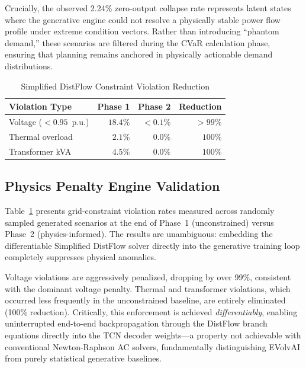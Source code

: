\documentclass[conference]{IEEEtran}
\begin{document}
Crucially, the observed 2.24\% zero-output collapse rate represents latent states where the generative engine could not resolve a physically stable power flow profile under extreme condition vectors. Rather than introducing ``phantom demand,'' these scenarios are filtered during the CVaR calculation phase, ensuring that planning remains anchored in physically actionable demand distributions.

\begin{table}[!t]
  \centering
  \caption{Simplified DistFlow Constraint Violation Reduction}
  \label{tab:physics}
  \begin{tabular}{@{}lrrr@{}}
    \toprule
    \textbf{Violation Type} & \textbf{Phase 1} & \textbf{Phase 2}  & \textbf{Reduction} \\
    \midrule
    Voltage ($<0.95$~p.u.)   & $18.4\%$ & $<0.1\%$  & $>99\%$ \\
    Thermal overload          & $2.1\%$  & $0.0\%$  & $100\%$ \\
    Transformer kVA           & $4.5\%$ & $0.0\%$  & $100\%$ \\
    \bottomrule
  \end{tabular}
\end{table}

\subsection{Physics Penalty Engine Validation}

Table~\ref{tab:physics} presents grid-constraint violation rates measured across randomly sampled generated scenarios at the end of Phase~1 (unconstrained) versus Phase~2 (physics-informed). The results are unambiguous: embedding the differentiable Simplified DistFlow solver directly into the generative training loop completely suppresses physical anomalies. 

Voltage violations are aggressively penalized, dropping by over 99\%, consistent with the dominant voltage penalty. Thermal and transformer violations, which occurred less frequently in the unconstrained baseline, are entirely eliminated (100\% reduction). Critically, this enforcement is achieved \textit{differentiably}, enabling uninterrupted end-to-end backpropagation through the DistFlow branch equations directly into the TCN decoder weights---a property not achievable with conventional Newton-Raphson AC solvers, fundamentally distinguishing EVolvAI from purely statistical generative baselines.
\end{document}
